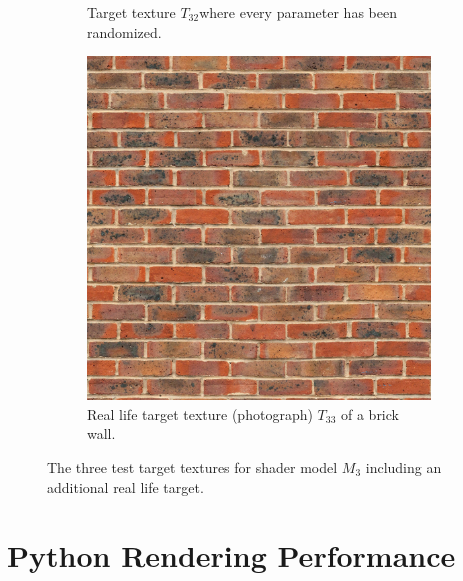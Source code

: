 \begin{figure}[!h]
\begin{subfigure}[t]{.25\textwidth}
    \caption{Target texture $T_ {32}$where every parameter has been randomized.}
    \label{fig:TargetM3T32Random}
\end{subfigure}\hspace{0.7cm}
\begin{subfigure}[t]{.25\textwidth}
    \centering
    \includegraphics[width=\linewidth]{img/evaluation/adv_brick_real_life_target.jpg}
    \caption{Real life target texture (photograph) $T_{33}$ of a brick wall.}
    \label{fig:TargetM3T33RealLife}
\end{subfigure}
\caption{The three test target textures for shader model $M_3$ including an additional real life target.}
\label{fig:TargetsM3}
\end{figure}

\section{Python Rendering Performance}

